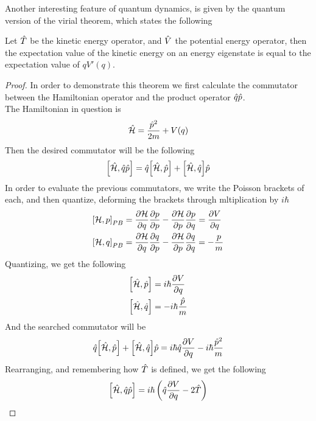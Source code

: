 \documentclass[../qm.tex]{subfiles}
\begin{document}
	Another interesting feature of quantum dynamics, is given by the quantum version of the virial theorem, which states the following
	\begin{thm}
		Let $\hat{T}$ be the kinetic energy operator, and $\hat{V}$ the potential energy operator, then the expectation value of the kinetic energy on an energy eigenstate is equal to the expectation value of $qV'(q)$.
	\end{thm}
	\begin{proof}
		In order to demonstrate this theorem we first calculate the commutator between the Hamiltonian operator and the product operator $\hat{q}\hat{p}$.\\
		The Hamiltonian in question is
		\begin{equation*}
			\hat{\mathcal{H}}=\frac{\hat{p}^2}{2m}+V(q)
		\end{equation*}
		Then the desired commutator will be the following
		\begin{equation*}
			\comm{\opr{\ham}}{\opr{q}\opr{p}}=\opr{q}\comm{\opr{\ham}}{\opr{p}}+\comm{\opr{\ham}}{\opr{q}}\opr{p}
		\end{equation*}
		In order to evaluate the previous commutators, we write the Poisson brackets of each, and then quantize, deforming the brackets through mltiplication by $i\hbar$
		\begin{equation*}
			\begin{aligned}
				\pcomm{\ham}{p}&=\pdv{\ham}{q}\pdv{p}{p}-\pdv{\ham}{p}\pdv{p}{q}=\pdv{V}{q}\\
				\pcomm{\ham}{q}&=\pdv{\ham}{q}\pdv{q}{p}-\pdv{\ham}{p}\pdv{q}{q}=-\frac{p}{m}
			\end{aligned}
		\end{equation*}
		Quantizing, we get the following
		\begin{equation*}
			\begin{aligned}
				\comm{\opr{\ham}}{\opr{p}}&=i\hbar\pdv{V}{q}\\
				\comm{\opr{\ham}}{\opr{q}}&=-i\hbar\frac{\opr{p}}{m}
			\end{aligned}
		\end{equation*}
		And the searched commutator will be
		\begin{equation*}
			\opr{q}\comm{\opr{\ham}}{\opr{p}}+\comm{\opr{\ham}}{\opr{q}}\opr{p}=i\hbar\opr{q}\pdv{V}{q}-i\hbar\frac{\opr{p}^2}{m}
		\end{equation*}
		Rearranging, and remembering how $\hat{T}$ is defined, we get the following
		\begin{equation*}
			\comm{\opr{\ham}}{\opr{q}\opr{p}}=i\hbar\left( \opr{q}\pdv{V}{q}-2\opr{T} \right)

\end{equation*}
\end{proof}
\end{document}
